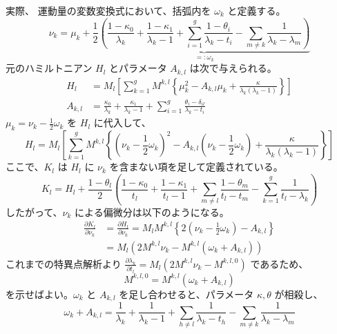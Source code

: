 実際、
運動量の変数変換式において、括弧内を $\omega_k$ と定義する。
\begin{equation*}
    \nu_k = \mu_k + \frac{1}{2} \underbrace{\left( \frac{1-\kappa_0}{\lambda_k} + \frac{1-\kappa_1}{\lambda_k-1} + \sum_{i=1}^g \frac{1-\theta_i}{\lambda_k-t_i} - \sum_{m \neq k} \frac{1}{\lambda_k-\lambda_m} \right)}_{=: \omega_k}
\end{equation*}
元のハミルトニアン $H_l$ とパラメータ $A_{k,l}$ は次で与えられる。
\begin{align*}
    H_l &= M_l \left[ \sum_{k=1}^g M^{k,l} \left\{ \mu_k^2 - A_{k,l} \mu_k + \frac{\kappa}{\lambda_k(\lambda_k-1)} \right\} \right] \\
    A_{k,l} &= \frac{\kappa_0}{\lambda_k} + \frac{\kappa_1}{\lambda_k-1} + \sum_{i=1}^g \frac{\theta_i - \delta_{il}}{\lambda_k-t_i}
\end{align*}
$\mu_k = \nu_k - \frac{1}{2}\omega_k$ を $H_l$ に代入して、
\begin{equation*}
    H_l = M_l \left[ \sum_{k=1}^g M^{k,l} \left\{ \left(\nu_k - \frac{1}{2}\omega_k\right)^2 - A_{k,l} \left(\nu_k - \frac{1}{2}\omega_k\right) + \frac{\kappa}{\lambda_k(\lambda_k-1)} \right\} \right]
\end{equation*}
ここで、$K_l$ は $H_l$ に $\nu_k$ を含まない項を足して定義されている。
\begin{equation*}
    K_l = H_l + \frac{1-\theta_l}{2} \left( \frac{1-\kappa_0}{t_l} + \frac{1-\kappa_1}{t_l-1} + \sum_{m \neq l} \frac{1-\theta_m}{t_l-t_m} - \sum_{k=1}^g \frac{1}{t_l-\lambda_k} \right)
\end{equation*}
したがって、$\nu_k$ による偏微分は以下のようになる。
\begin{align*}
    \frac{\partial K_l}{\partial \nu_k} &= \frac{\partial H_l}{\partial \nu_k} = M_l M^{k,l} \left\{ 2\left(\nu_k - \frac{1}{2}\omega_k\right) - A_{k,l} \right\} \\
    &= M_l \left( 2 M^{k,l} \nu_k - M^{k,l}(\omega_k + A_{k,l}) \right)
\end{align*}
これまでの特異点解析より $\frac{\partial \lambda_k}{\partial t_l} = M_l(2 M^{k,l} \nu_k - M^{k,l,0})$ であるため、
\begin{equation*}
    M^{k,l,0} = M^{k,l}(\omega_k + A_{k,l})
\end{equation*}
を示せばよい。$\omega_k$ と $A_{k,l}$ を足し合わせると、パラメータ $\kappa, \theta$ が相殺し、
\begin{equation*}
    \omega_k + A_{k,l} = \frac{1}{\lambda_k} + \frac{1}{\lambda_k-1} + \sum_{h \neq l} \frac{1}{\lambda_k-t_h} - \sum_{m \neq k} \frac{1}{\lambda_k-\lambda_m}
\end{equation*}
